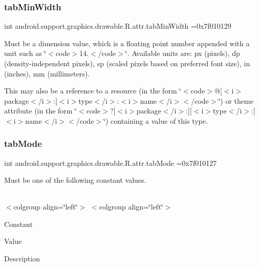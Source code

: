 \subsubsection{\texorpdfstring{tab\+Min\+Width}{tabMinWidth}}
{\footnotesize\ttfamily int android.\+support.\+graphics.\+drawable.\+R.\+attr.\+tab\+Min\+Width =0x7f010129\hspace{0.3cm}{\ttfamily [static]}}

Must be a dimension value, which is a floating point number appended with a unit such as \char`\"{}$<$code$>$14.\+5sp$<$/code$>$\char`\"{}. Available units are\+: px (pixels), dp (density-\/independent pixels), sp (scaled pixels based on preferred font size), in (inches), mm (millimeters). 

This may also be a reference to a resource (in the form \char`\"{}$<$code$>$@\mbox{[}$<$i$>$package$<$/i$>$\+:\mbox{]}$<$i$>$type$<$/i$>$\+:$<$i$>$name$<$/i$>$$<$/code$>$\char`\"{}) or theme attribute (in the form \char`\"{}$<$code$>$?\mbox{[}$<$i$>$package$<$/i$>$\+:\mbox{]}\mbox{[}$<$i$>$type$<$/i$>$\+:\mbox{]}$<$i$>$name$<$/i$>$$<$/code$>$\char`\"{}) containing a value of this type. \mbox{\label{classandroid_1_1support_1_1graphics_1_1drawable_1_1R_1_1attr_aa537699ee277ef8fb9894bf05b8042df}} 
\subsubsection{\texorpdfstring{tab\+Mode}{tabMode}}
{\footnotesize\ttfamily int android.\+support.\+graphics.\+drawable.\+R.\+attr.\+tab\+Mode =0x7f010127\hspace{0.3cm}{\ttfamily [static]}}

Must be one of the following constant values.

\tabulinesep=1mm
\begin{longtabu} spread 0pt [c]{*{0}{|X[-1]}|}
\hline
\end{longtabu}
$<$colgroup align=\char`\"{}left\char`\"{}$>$ $<$colgroup align=\char`\"{}left\char`\"{}$>$ 

Constant

Value

Description 

